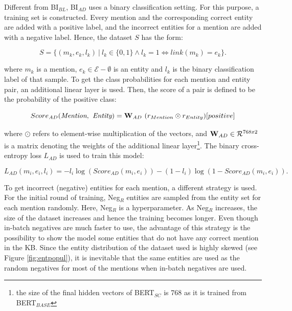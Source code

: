 \documentclass{report}
\theoremstyle{definition}
\theoremstyle{remark}
\begin{document}
Different from BI$_{BL}$, BI$_{AD}$ uses a binary classification setting. For this purpose, a training set is constructed. Every mention and the corresponding correct entity are added with a positive label, and the incorrect entities for a mention are added with a negative label. Hence, the dataset $S$ has the form:

\begin{equation}
    S = \{ (m_k,e_k,l_k) \ | \ l_k \in \{0,1\} \land l_k=1 \iff link(m_k) = e_k \}.
\end{equation}

\noindent where $m_k$ is a mention, $e_k \in \mathcal{E}-\emptyset$ is an entity and $l_k$ is the binary classification label of that sample. To get the class probabilities for each mention and entity pair, an additional linear layer is used. Then, the score of a pair is defined to be the probability of the positive class:

\begin{equation}
    Score_{AD}(\textit{Mention},\textit{ Entity}) = \bold{W}_{AD} \ (r_{Mention} \odot r_{Entity}) [positive]
\end{equation}

\noindent where $\odot$ refers to element-wise multiplication of the vectors, and $\bold{W}_{AD} \in \mathcal{R}^{768x2}$ is a matrix denoting the weights of the additional linear layer\footnote{the size of the final hidden vectors of BERT$_{SC}$ is 768 as it is trained from BERT$_{BASE}$}. The binary cross-entropy loss $L_{AD}$ is used to train this model:

\begin{equation}
    L_{AD}(m_i,e_i,l_i) = - l_i \log (Score_{AD}(m_i,e_i)) - (1-l_i) \log (1-Score_{AD}(m_i,e_i)).
\end{equation}

To get incorrect (negative) entities for each mention, a different strategy is used. For the initial round of training, Neg$_{R}$ entities are sampled from the entity set for each mention randomly. Here, Neg$_{R}$ is a hyperparameter. As Neg$_{R}$ increases, the size of the dataset increases and hence the training becomes longer. Even though in-batch negatives are much faster to use, the advantage of this strategy is the possibility to show the model some entities that do not have any correct mention in the KB. Since the entity distribution of the dataset used is highly skewed (see Figure \ref{fig:entpopul}), it is inevitable that the same entities are used as the random negatives for most of the mentions when in-batch negatives are used.
\end{document}
